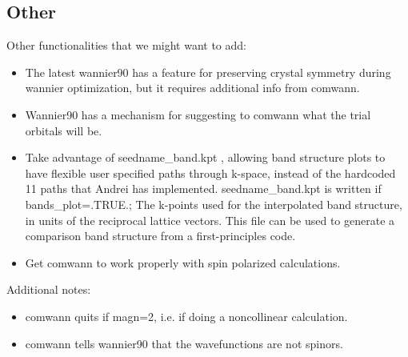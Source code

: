\documentclass[aps,prb,singlecolumn,preprintnumbers,amsmath,amssymb]{revtex4}
\begin{document}
 
 


\subsection{Other}



   Other functionalities that we might want to add:
\begin{itemize}
\item The latest wannier90 has a feature for preserving crystal symmetry during wannier optimization, but it requires additional info from comwann.
\item Wannier90 has  a mechanism for suggesting to comwann what the trial orbitals will be.
\item  Take advantage of seedname\_band.kpt , allowing band structure plots to have flexible user specified paths through k-space, instead of the hardcoded 11 paths that Andrei has implemented.  seedname\_band.kpt is written if bands\_plot=.TRUE.; The k-points used for the interpolated band structure, in units of the reciprocal lattice vectors. This file can be used to generate a comparison band structure from a first-principles code.
\item Get comwann to work properly with spin polarized calculations.  %
\end{itemize}

     Additional notes:
     \begin{itemize}
  \item comwann quits if magn=2, i.e. if doing a noncollinear calculation.
\item comwann tells wannier90 that the wavefunctions are not spinors.
     \end{itemize}
     

       
\end{document}
